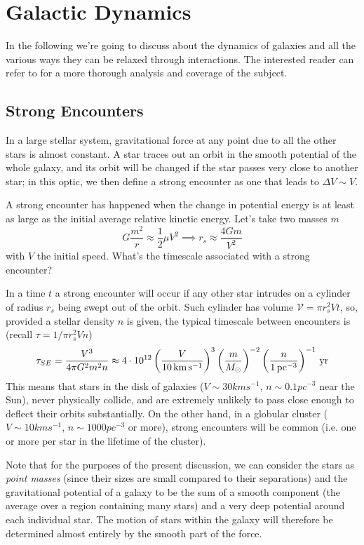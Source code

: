 \chapter{Galactic Dynamics}\label{ch:vii}

In the following we're going to discuss about the dynamics of galaxies and all the various ways they can be relaxed through interactions. The interested reader can refer to \cite{2009PhT....62e..56B} for a more thorough analysis and coverage of the subject.

\section{Strong Encounters}

In a large stellar system, gravitational force at any point due to all the other stars is almost constant. A star traces out an orbit in the smooth potential of the whole galaxy, and its orbit will be changed if the star passes very close to another star; in this optic, we then define a strong encounter as one that leads to $\Delta V \sim V$.
\par A strong encounter has happened when the change in potential energy is at least as large as the initial average relative kinetic energy. Let’s take two masses $m$
\begin{equation*}
    G\frac{m^{2}}{r} \approx \frac{1}{2}\mu V^{2} \implies r_{s}\approx \frac{4Gm}{V^{2}}
\end{equation*}
with $V$ the initial speed. What's the timescale associated with a strong encounter?
\par In a time $t$ a strong encounter will occur if any other star intrudes on a cylinder of radius $r_{s}$ being swept out of the orbit. Such cylinder has volume $\mathcal{V} = \pi r_{s}^{2}Vt$, so, provided a stellar density $n$ is given, the typical timescale between encounters is (recall $\tau = 1/\pi r_{s}^{2}Vn$) 
\begin{equation*}
    \tau_{SE} = \frac{V^{3}}{4\pi G^{2}m^{2}n} \approx 4\cdot 10^{12}\left(\frac{V}{10\,\text{km}\,\text{s}^{-1}}\right)^{3}\left(\frac{m}{M_{\odot}}\right)^{-2}\left(\frac{n}{1\,\text{pc}^{-3}}\right)^{-1}\,\text{yr}
    \label{eq:setimescale}
\end{equation*}
This means that stars in the disk of galaxies ($V \sim 30 \unit{km}\unit{s}^{-1}$, $n \sim 0.1 \unit{pc}^{-3}$ near the Sun), never physically collide, and are extremely unlikely to pass close enough to deflect their orbits substantially. On the other hand, in a globular cluster ($V \sim 10 \unit{km}\unit{s}^{-1}$, $n \sim 1000 \unit{pc}^{-3}$ or more), strong encounters will be common (i.e. one or more per star in the lifetime of the cluster).
\par Note that for the purposes of the present discussion, we can consider the stars as \emph{point masses} (since their sizes are small compared to their separations) and the gravitational potential of a galaxy to be the sum of a smooth component (the average over a region containing many stars) and a very deep potential around each individual star. The motion of stars within the galaxy will therefore be determined almost entirely by the smooth part of the force.

